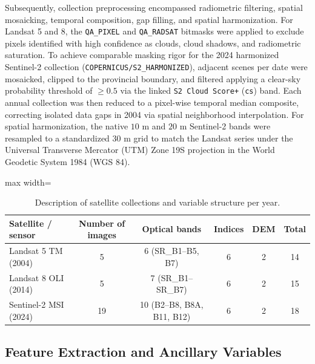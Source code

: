 \documentclass[runningheads]{llncs}
\begin{document}
Subsequently, collection preprocessing encompassed radiometric filtering, spatial mosaicking, temporal composition, gap filling, and spatial harmonization. For Landsat 5 and 8, the \texttt{QA\_PIXEL} and \texttt{QA\_RADSAT} bitmasks were applied to exclude pixels identified with high confidence as clouds, cloud shadows, and radiometric saturation. To achieve comparable masking rigor for the 2024 harmonized Sentinel-2 collection (\texttt{COPERNICUS/S2\_HARMONIZED}), adjacent scenes per date were mosaicked, clipped to the provincial boundary, and filtered applying a clear-sky probability threshold of $\geq 0.5$ via the linked \texttt{S2 Cloud Score+} (\texttt{cs}) band. Each annual collection was then reduced to a pixel-wise temporal median composite, correcting isolated data gaps in 2004 via spatial neighborhood interpolation. For spatial harmonization, the native $10\text{ m}$ and $20\text{ m}$ Sentinel-2 bands were resampled to a standardized $30\text{ m}$ grid to match the Landsat series under the Universal Transverse Mercator (UTM) Zone 19S projection in the World Geodetic System 1984 (WGS 84).

\begin{table}[t]
\caption{Description of satellite collections and variable structure per year.}
\label{tab:datos_satelitales}
\small
\setlength{\tabcolsep}{5pt}
\begin{adjustbox}{max width=\textwidth}
\begin{tabular}{lccccc}
\hline
Satellite / sensor  &
Number of images &
Optical bands &
Indices &
DEM &
Total\\
\hline
Landsat 5 TM (2004)   & 5  & 6 (SR\_B1--B5, B7)         & 6 & 2 & 14 \\
Landsat 8 OLI (2014)  & 5  & 7 (SR\_B1--SR\_B7)         & 6 & 2 & 15 \\
Sentinel-2 MSI (2024) & 19 & 10 (B2--B8, B8A, B11, B12) & 6 & 2 & 18 \\
\hline
\end{tabular}
\end{adjustbox}
\end{table}

\subsection{Feature Extraction and Ancillary Variables}
\label{subsec:extraccion_caracteristicas}
\end{document}
